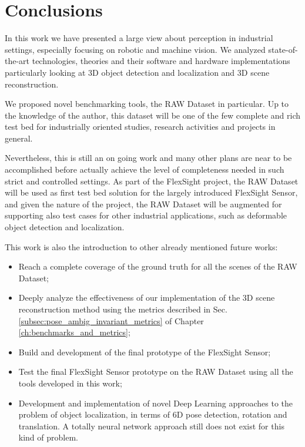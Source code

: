 \chapter{Conclusions}\label{ch:conclusions}
In this work we have presented a large view about perception in industrial settings, especially focusing on robotic and machine vision. We analyzed state-of-the-art technologies, theories and their software and hardware implementations particularly looking at 3D object detection and localization and 3D scene reconstruction.

We proposed novel benchmarking tools, the RAW Dataset in particular. Up to the knowledge of the author, this dataset will be one of the few complete and rich test bed for industrially oriented studies, research activities and projects in general.

Nevertheless, this is still an on going work and many other plans are near to be accomplished before actually achieve the level of completeness needed in such strict and controlled settings. As part of the FlexSight project, the RAW Dataset will be used as first test bed solution for the largely introduced FlexSight Sensor, and given the nature of the project, the RAW Dataset will be augmented for supporting also test cases for other industrial applications, such as deformable object detection and localization.

This work is also the introduction to other already mentioned future works:

\begin{itemize}
	\item Reach a complete coverage of the ground truth for all the scenes of the RAW Dataset;
	\item Deeply analyze the effectiveness of our implementation of the 3D scene reconstruction method using the metrics described in Sec. \ref{subsec:pose_ambig_invariant_metrics} of Chapter \ref{ch:benchmarks_and_metrics};
	\item Build and development of the final prototype of the FlexSight Sensor;
	\item Test the final FlexSight Sensor prototype on the RAW Dataset using all the tools developed in this work;
	\item Development and implementation of novel Deep Learning approaches to the problem of object localization, in terms of 6D pose detection, rotation and translation. A totally neural network approach still does not exist for this kind of problem.
\end{itemize}

